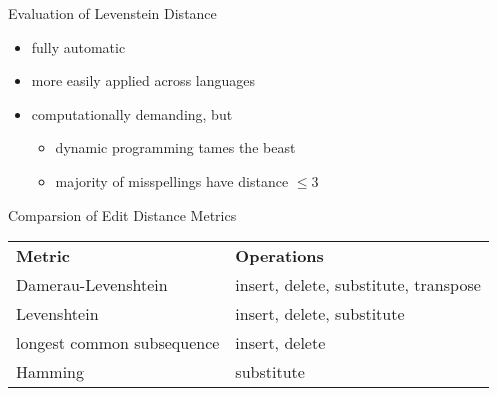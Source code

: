 \documentclass[professionalfonts, xcolor={usenames,svgnames,x11names,table}]{beamer}
\begin{document}
\begin{frame}{Evaluation of Levenstein Distance}
    \begin{itemize}
        \item fully automatic
        \item more easily applied across languages
        \item computationally demanding, but
            \begin{itemize}
                \item dynamic programming tames the beast
                \item majority of misspellings have distance $\leq 3$
            \end{itemize}
    \end{itemize}

    \pause
    \begin{block}{Comparsion of Edit Distance Metrics}
        \centering
        \begin{tabular}{ll}
            \textbf{Metric} & \textbf{Operations}\\
            Damerau-Levenshtein & insert, delete, substitute, transpose\\
            Levenshtein & insert, delete, substitute\\
            longest common subsequence & insert, delete\\
            Hamming & substitute
        \end{tabular}
    \end{block}
\end{frame}
\end{document}
